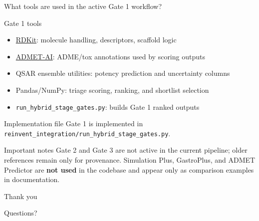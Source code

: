 \documentclass[aspectratio=169,10pt]{beamer}
\begin{document}
\begin{frame}{What tools are used in the active Gate 1 workflow?}
  \small
  \begin{block}{Gate 1 tools}
    \begin{itemize}
      \item \href{https://www.rdkit.org/}{RDKit}: molecule handling, descriptors, scaffold logic
      \item \href{https://github.com/swansonk14/admet_ai}{ADMET-AI}: ADME/tox annotations used by scoring outputs
      \item QSAR ensemble utilities: potency prediction and uncertainty columns
      \item Pandas/NumPy: triage scoring, ranking, and shortlist selection
      \item \texttt{run\_hybrid\_stage\_gates.py}: builds Gate 1 ranked outputs
    \end{itemize}
  \end{block}

  \vspace{4pt}
  \begin{exampleblock}{Implementation file}
    Gate 1 is implemented in \texttt{reinvent\_integration/run\_hybrid\_stage\_gates.py}.
  \end{exampleblock}

  \begin{alertblock}{Important notes}
    Gate 2 and Gate 3 are not active in the current pipeline; older references
    remain only for provenance. Simulation Plus, GastroPlus, and ADMET Predictor
    are \textbf{not used} in the codebase and appear only as comparison examples
    in documentation.
  \end{alertblock}
\end{frame}

\begin{frame}{Thank you}
  \begin{center}
    \Large Questions?
  \end{center}
\end{frame}
\end{document}
